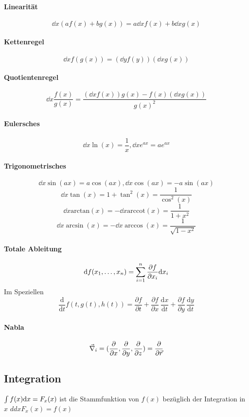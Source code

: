 \paragraph{Linearität}
$$\dd x (a f(x) + b g(x)) = a \dd x f(x) + b \dd x g(x)$$

\paragraph{Kettenregel}
$$\dd x f(g(x)) = (\dd y f(y))(\dd x g(x))$$

\paragraph{Quotientenregel}
$$\dd x \frac{f(x)}{g(x)} = \frac{(\dd x f(x))g(x) - f(x)(\dd x g(x))}{g(x)^2}$$

\paragraph{Eulersches}
$$\dd x \ln(x) = \frac1x, \dd x e^{ax} = a e^{ax}$$

\paragraph{Trigonometrisches}
$$\dd x \sin(ax) = a \cos(ax), \dd x \cos(ax) = - a \sin(ax)$$
$$\dd x \tan(x) = 1 + \tan^2(x) = \frac1{\cos^2(x)}$$
$$\dd x \mathrm{arctan}(x) = - \dd x \mathrm{arccot}(x) = \frac{1}{1 + x^2}$$
$$\dd x \arcsin(x) = - \dd x \arccos(x) = \frac1{\sqrt{1 - x^2}}$$

\paragraph{Totale Ableitung}
$$\mathrm d f(x_1, \dots, x_n) = \sum_{i = 1}^{n} \frac{\partial f}{\partial x_i} \mathrm d x_i$$
Im Speziellen
$$\frac{\mathrm d}{\mathrm dt} f(t,g(t),h(t)) = \frac{\partial f}{\partial t} + \frac{\partial f}{\partial x} \, \frac{\mathrm dx}{\mathrm dt} + \frac{\partial f}{\partial y} \,\frac{\mathrm dy}{\mathrm dt} $$

\paragraph{Nabla}
$$\vec{\nabla}_i = (\frac{\partial}{\partial x}, \frac{\partial}{\partial y}, \frac{\partial}{\partial z}) = \frac{\partial}{\partial \vec{r}}$$

\subsection{Integration}
$\int f(x) \mathrm d x = F_x(x)$ ist die Stammfunktion von $f(x)$ bezüglich der Integration in $x$ \conseq $dd x F_x(x) = f(x)$

